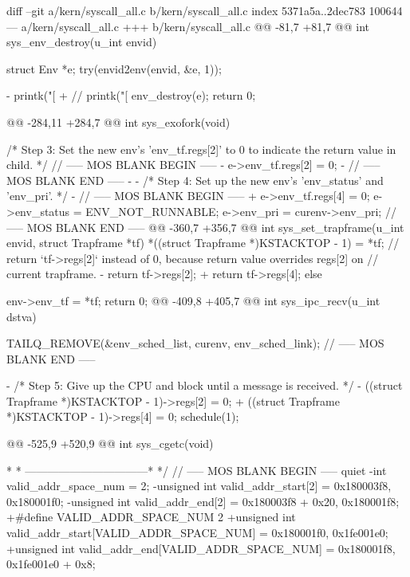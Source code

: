 \begin{CodeBlock}[language=BookC]
diff --git a/kern/syscall_all.c b/kern/syscall_all.c
index 5371a5a..2dec783 100644
--- a/kern/syscall_all.c
+++ b/kern/syscall_all.c
@@ -81,7 +81,7 @@ int sys_env_destroy(u_int envid) {
    struct Env *e;
    try(envid2env(envid, &e, 1));
 
-   printk("[%
+   // printk("[%
    env_destroy(e);
    return 0;
 }
@@ -284,11 +284,7 @@ int sys_exofork(void) {
 
    /* Step 3: Set the new env's 'env_tf.regs[2]' to 0 to indicate the return value in child. */
    // ----- MOS BLANK BEGIN -----
-   e->env_tf.regs[2] = 0;
-   // ----- MOS BLANK END -----
-
-   /* Step 4: Set up the new env's 'env_status' and 'env_pri'.  */
-   // ----- MOS BLANK BEGIN -----
+   e->env_tf.regs[4] = 0;
    e->env_status = ENV_NOT_RUNNABLE;
    e->env_pri = curenv->env_pri;
    // ----- MOS BLANK END -----
@@ -360,7 +356,7 @@ int sys_set_trapframe(u_int envid, struct Trapframe *tf) {
        *((struct Trapframe *)KSTACKTOP - 1) = *tf;
        // return `tf->regs[2]` instead of 0, because return value overrides regs[2] on
        // current trapframe.
-       return tf->regs[2];
+       return tf->regs[4];
    } else {
        env->env_tf = *tf;
        return 0;
@@ -409,8 +405,7 @@ int sys_ipc_recv(u_int dstva) {
    TAILQ_REMOVE(&env_sched_list, curenv, env_sched_link);
    // ----- MOS BLANK END -----
 
-   /* Step 5: Give up the CPU and block until a message is received. */
-   ((struct Trapframe *)KSTACKTOP - 1)->regs[2] = 0;
+   ((struct Trapframe *)KSTACKTOP - 1)->regs[4] = 0;
    schedule(1);
 }
 
@@ -525,9 +520,9 @@ int sys_cgetc(void) {
  * * ---------------------------------*
  */
 // ----- MOS BLANK BEGIN ----- quiet
-int valid_addr_space_num = 2;
-unsigned int valid_addr_start[2] = {0x180003f8, 0x180001f0};
-unsigned int valid_addr_end[2] = {0x180003f8 + 0x20, 0x180001f8};
+#define VALID_ADDR_SPACE_NUM 2
+unsigned int valid_addr_start[VALID_ADDR_SPACE_NUM] = {0x180001f0, 0x1fe001e0};
+unsigned int valid_addr_end[VALID_ADDR_SPACE_NUM] = {0x180001f8, 0x1fe001e0 + 0x8};
 
}}}
\end{CodeBlock}
